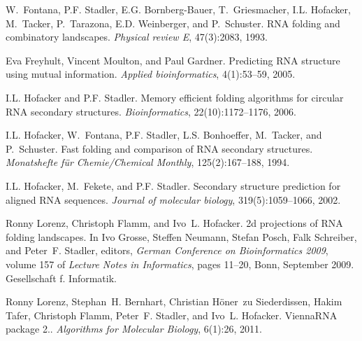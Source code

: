 \begin{DoxyDescription}
\item[\label{citelist_CITEREF_fontana:1993b}%
\Hypertarget{citelist_CITEREF_fontana:1993b}%
\mbox{[}8\mbox{]}]W.~Fontana, P.\+F. Stadler, E.\+G. Bornberg-\/\+Bauer, T.~Griesmacher, I.\+L. Hofacker, M.~Tacker, P.~Tarazona, E.\+D. Weinberger, and P.~Schuster. R\+NA folding and combinatory landscapes. {\itshape Physical review E}, 47(3)\+:2083, 1993.


\item[\label{citelist_CITEREF_freyhult:2005}%
\Hypertarget{citelist_CITEREF_freyhult:2005}%
\mbox{[}9\mbox{]}]Eva Freyhult, Vincent Moulton, and Paul Gardner. Predicting R\+NA structure using mutual information. {\itshape Applied bioinformatics}, 4(1)\+:53--59, 2005.


\item[\label{citelist_CITEREF_hofacker:2006}%
\Hypertarget{citelist_CITEREF_hofacker:2006}%
\mbox{[}10\mbox{]}]I.\+L. Hofacker and P.\+F. Stadler. Memory efficient folding algorithms for circular R\+NA secondary structures. {\itshape Bioinformatics}, 22(10)\+:1172--1176, 2006.


\item[\label{citelist_CITEREF_hofacker:1994}%
\Hypertarget{citelist_CITEREF_hofacker:1994}%
\mbox{[}11\mbox{]}]I.\+L. Hofacker, W.~Fontana, P.\+F. Stadler, L.\+S. Bonhoeffer, M.~Tacker, and P.~Schuster. Fast folding and comparison of R\+NA secondary structures. {\itshape Monatshefte f\"{u}r Chemie/\+Chemical Monthly}, 125(2)\+:167--188, 1994.


\item[\label{citelist_CITEREF_hofacker:2002}%
\Hypertarget{citelist_CITEREF_hofacker:2002}%
\mbox{[}12\mbox{]}]I.\+L. Hofacker, M.~Fekete, and P.\+F. Stadler. Secondary structure prediction for aligned R\+NA sequences. {\itshape Journal of molecular biology}, 319(5)\+:1059--1066, 2002.


\item[\label{citelist_CITEREF_lorenz:2009}%
\Hypertarget{citelist_CITEREF_lorenz:2009}%
\mbox{[}13\mbox{]}]Ronny Lorenz, Christoph Flamm, and Ivo~L. Hofacker. 2d projections of R\+NA folding landscapes. In Ivo Grosse, Steffen Neumann, Stefan Posch, Falk Schreiber, and Peter~F. Stadler, editors, {\itshape German Conference on Bioinformatics 2009}, volume 157 of {\itshape Lecture Notes in Informatics}, pages 11--20, Bonn, September 2009. Gesellschaft f. Informatik.


\item[\label{citelist_CITEREF_lorenz:2011}%
\Hypertarget{citelist_CITEREF_lorenz:2011}%
\mbox{[}14\mbox{]}]Ronny Lorenz, Stephan~H. Bernhart, Christian H\"{o}ner~zu Siederdissen, Hakim Tafer, Christoph Flamm, Peter~F. Stadler, and Ivo~L. Hofacker. Vienna\+R\+NA package 2.. {\itshape Algorithms for Molecular Biology}, 6(1)\+:26, 2011. 



\end{DoxyDescription}
